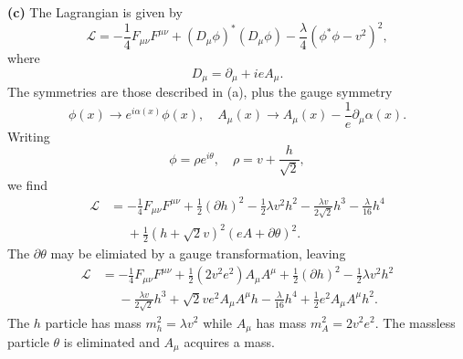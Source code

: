 \documentclass{article}
\makeatletter
\newcommand*{\shifttext}[1]{%
  \settowidth{\@tempdima}{#1}%
  \hspace{-\@tempdima}#1%
}
\newcommand{\plabel}[1]{%
\shifttext{\textbf{#1}\quad}%
}
\makeatother
\begin{document}
\plabel{(c)}%
The Lagrangian is given by
\[ \mathcal{L} = -\frac{1}{4} F_{\mu\nu}F^{\mu\nu} + (D_\mu\phi)^*(D_\mu\phi) - \frac{\lambda}{4}(\phi^* \phi - v^2)^2, \]
where
\[ D_\mu = \partial_\mu + ieA_\mu. \]
The symmetries are those described in (a), plus the gauge symmetry
\[ \phi(x) \rightarrow e^{i\alpha(x)}\phi(x),\quad A_\mu(x) \rightarrow A_\mu(x) - \frac{1}{e} \partial_\mu \alpha(x). \]
Writing
\[ \phi = \rho e^{i\theta}, \quad \rho = v + \frac{h}{\sqrt{2}}, \]
we find
\begin{align*}
    \mathcal{L} &= -\frac{1}{4} F_{\mu\nu}F^{\mu\nu} + \frac{1}{2}(\partial h)^2  - \frac{1}{2}\lambda v^2 h^2 - \frac{\lambda v}{2\sqrt{2}} h^3 - \frac{\lambda}{16} h^4  \\
    &\phantom{{}={}} + \frac{1}{2}(h+\sqrt{2}v)^2 (eA + \partial\theta)^2.
\end{align*}
The $\partial \theta$ may be elimiated by a gauge transformation, leaving
\begin{align*}
    \mathcal{L} &= -\frac{1}{4} F_{\mu\nu}F^{\mu\nu} + \frac{1}{2} (2 v^2e^2) A_\mu A^\mu + \frac{1}{2}(\partial h)^2  - \frac{1}{2}\lambda v^2 h^2   \\
    &\phantom{{}={}} - \frac{\lambda v}{2\sqrt{2}} h^3 + \sqrt{2}ve^2 A_\mu A^\mu h - \frac{\lambda}{16} h^4 + \frac{1}{2}e^2 A_\mu A^\mu h^2.
\end{align*}
The $h$ particle has mass $m^2_h = \lambda v^2$ while $A_\mu$ has mass $m_A^2 = 2v^2 e^2$.
The massless particle $\theta$ is eliminated and $A_\mu$ acquires a mass.
\end{document}
